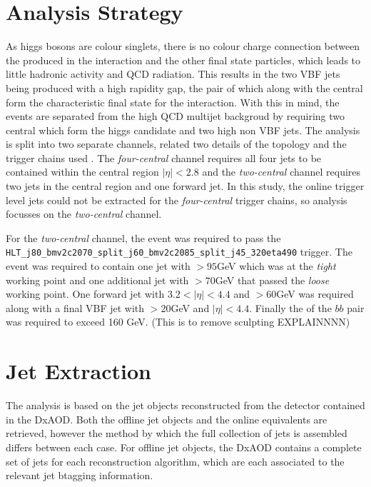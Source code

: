	\section{\VBFHBB Analysis Strategy} 
		As higgs bosons are colour singlets, there is no colour charge connection between the \bquarks produced in the interaction and the other final state particles, which leads to little hadronic activity and QCD radiation. This results in the two VBF jets being produced with a high rapidity gap, the pair of which along with the central \bjets form the characteristic final state for the interaction. With this in mind, the \VBFHBB events are separated from the high QCD multijet backgroud by requiring two central \bjets which form the higgs candidate and two high \pt non \btagged  VBF jets. The analysis is split into two separate channels, related two details of the topology and the trigger chains used . The \textit{four-central} channel requires all four jets to be contained within the central region $|\eta| < 2.8$ and the \textit{two-central} channel requires two jets in the central region and one forward jet. In this study, the online trigger level jets could not be extracted for the \textit{four-central} trigger chains, so analysis focusses on the \textit{two-central} channel. 
		
		For the \textit{two-central} channel, the event was required to pass the \verb|HLT_j80_bmv2c2070_split_j60_bmv2c2085_split_j45_320eta490| trigger. The event was required to contain one jet with \pt$>95$GeV which was \btagged at the \textit{tight} working point and one additional jet with \pt$>70$GeV that passed the \textit{loose} \btag working point. One forward jet with $3.2 < |\eta| < 4.4$ and \pt$>60$GeV was required along with a final VBF jet with \pt$>20$GeV and $|\eta| < 4.4$. Finally the \pt of the $bb$ pair was required to exceed 160 GeV. (This is to remove sculpting EXPLAINNNN)
		
	\section{Jet Extraction}
	
		The analysis is based on the jet objects reconstructed from the detector contained in the DxAOD. Both the offline jet objects and the online equivalents are retrieved, however the method by which the full collection of jets is assembled differs between each case. For offline jet objects, the DxAOD contains a complete set of jets for each reconstruction algorithm, which are each associated to the relevant jet btagging information. 
		
